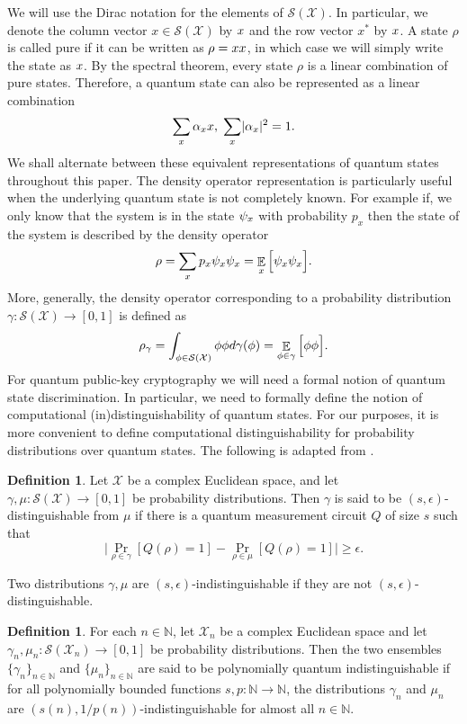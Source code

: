 \documentclass[11pt]{article}
\theoremstyle{plain}
\theoremstyle{definition}
\newtheorem{definition}[theorem]{Definition}
\DeclareMathOperator{\E}{\mathbb{E}}
\DeclarePairedDelimiter{\abs}{\lvert}{\rvert}
\let\ket\relax
\DeclarePairedDelimiter{\ket}{\lvert}{\rangle}
\let\bra\relax
\DeclarePairedDelimiter{\bra}{\langle}{\rvert}
\def\N{\mathbb{N}}
\def\X{\mathcal{X}}
\def\SX{\mathcal{S(X)}}
\begin{document}
We will use the Dirac notation for the elements of $\SX$. In particular, we denote the column vector $x \in \SX$ by $\ket{x}$ and the row vector $x^*$ by $\bra{x}$. A state $\rho$ is called pure if it can be written as $\rho = \ket{x}\bra{x}$, in which case we will simply write the state as $\ket{x}$. By the spectral theorem, every state $\rho$ is a linear combination of pure states. Therefore, a quantum state can also be represented as a linear combination
\[ \sum_{x} \alpha_x \ket{x}, \hspace*{1mm} \sum_{x} \abs{\alpha_x}^2 = 1. \]
We shall alternate between these equivalent representations of quantum states throughout this paper. The density operator representation is particularly useful when the underlying quantum state is not completely known. For example if, we only know that the system is in the state $\ket{\psi_x}$ with probability $p_x$ then the state of the system is described by the density operator
\[ \rho = \sum_{x} p_x \ket{\psi_x}\bra{\psi_x} = \E_x \Big[ \ket{\psi_x} \bra{\psi_x} \Big]. \]
More, generally, the density operator corresponding to a probability distribution $\gamma: \SX \rightarrow [0, 1]$ is defined as
\[ \rho_\gamma = \int_{\ket{\phi} \in \SX} \ket{\phi}\bra{\phi} d\gamma(\ket{\phi}) = \E_{\ket{\phi} \in \gamma} \Big[ \ket{\phi}\bra{\phi} \Big]. \]
For quantum public-key cryptography we will need a formal notion of quantum state discrimination. In particular, we need to formally define the notion of computational (in)distinguishability of quantum states. For our purposes, it is more convenient to define computational distinguishability for probability distributions over quantum states. The following is adapted from \cite[\S 3.3]{watrous2009zero}.
\begin{definition}
    Let $\X$ be a complex Euclidean space, and let $\gamma, \mu: \SX \rightarrow [0, 1]$ be probability distributions. Then $\gamma$ is said to be $(s, \epsilon)$-distinguishable from $\mu$ if there is a quantum measurement circuit $Q$ of size $s$ such that
    \[ \Big| \Pr_{\rho \in \gamma}[Q(\rho) = 1] - \Pr_{\rho \in \mu}[Q(\rho) = 1] \Big| \ge \epsilon. \]
\end{definition} 
Two distributions $\gamma, \mu$ are $(s, \epsilon)$-indistinguishable if they are not $(s, \epsilon)$-distinguishable.
\begin{definition}
    For each $n \in \N$, let $\X_n$ be a complex Euclidean space and let $\gamma_n, \mu_n: \mathcal{S}(\X_n) \rightarrow [0, 1]$ be probability distributions. Then the two ensembles $\{ \gamma_n \}_{n \in \N}$ and $\{ \mu_n \}_{n \in \N}$ are said to be polynomially quantum indistinguishable if for all polynomially bounded functions $s, p: \N \rightarrow \N$, the distributions $\gamma_n$ and $\mu_n$ are $(s(n), 1 / p(n))$-indistinguishable for almost all $n \in \N$.
\end{definition}
\end{document}
